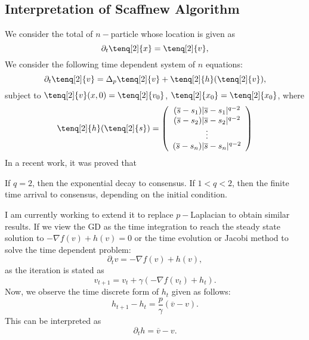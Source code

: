 \begin{itemize}
\section{Interpretation of Scaffnew Algorithm} 
We consider the total of $n-$particle whose location is given as 
\begin{equation}
\partial_t \tenq[2]{x} = \tenq[2]{v}, 
\end{equation}
We consider the following time dependent system of $n$ equations:  
\begin{equation} 
\partial_t \tenq[2]{v} = \Delta_p \tenq[2]{v} + \tenq[2]{h}(\tenq[2]{v}), 
\end{equation} 
subject to $\tenq[2]{v}(x,0) = \tenq[2]{v_0}$, $\tenq[2]{x_0} = \tenq[2]{x_0}$, where 
\begin{equation}
\tenq[2]{h}(\tenq[2]{s}) = \left ( \begin{array}{c} 
(\overline{s} - s_1 ) |\overline{s} - s_1|^{q-2} \\ (\overline{s} - s_2 ) |\overline{s} - s_2|^{q-2} \\ \vdots \\ ( \overline{s} - s_n ) |\overline{s} - s_n|^{q-2} \end{array} \right )
\end{equation} 
In a recent work, it was proved that 
\begin{theorem}
If $q = 2$, then the exponential decay to consensus. If $1 < q < 2$, then the finite time arrival to consensus, depending on the initial condition.  
\end{theorem}
I am currently working to extend it to replace $p-$Laplacian to obtain similar results. If we view the GD as the time integration to reach the steady state solution to $-\nabla f(v) + h(v) = 0$ or the time evolution or Jacobi method to solve the time dependent problem: 
\begin{equation}
\partial_t v = -\nabla f(v) + h(v), 
\end{equation}
as the iteration is stated as 
\begin{equation}
v_{t+1} = v_t + \gamma(-\nabla f(v_t) + h_t). 
\end{equation}
Now, we observe the time discrete form of $h_t$ given as follows: 
\begin{equation}
h_{t+1} - h_t = \frac{p}{\gamma}(\overline{v} - v). 
\end{equation}
This can be interpreted as 
\begin{equation}
\partial_t h = \overline{v} - v. 
\end{equation}

\end{itemize}
